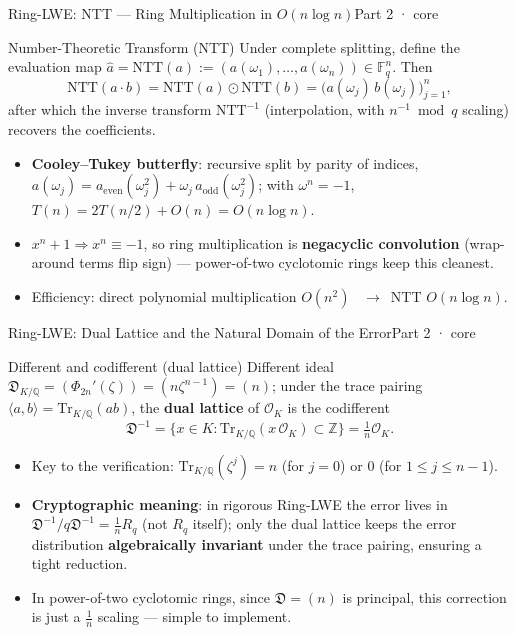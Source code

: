 \documentclass[aspectratio=169, 11pt]{beamer}
\newcommand{\Z}{\mathbb{Z}}
\newcommand{\Q}{\mathbb{Q}}
\newcommand{\F}{\mathbb{F}}
\newcommand{\OK}{\mathcal{O}_K}
\newcommand{\Tr}{\mathrm{Tr}}
\begin{document}
\begin{frame}{Ring-LWE: NTT --- Ring Multiplication in $O(n\log n)$}{Part 2 · core}
  \begin{block}{Number-Theoretic Transform (NTT)}
    Under complete splitting, define the evaluation map
    $\widehat{a}=\mathrm{NTT}(a):=(a(\omega_1),\dots,a(\omega_n))\in\F_q^n$. Then
    \[
      \mathrm{NTT}(a\cdot b)=\mathrm{NTT}(a)\odot\mathrm{NTT}(b)
      =\bigl(a(\omega_j)\,b(\omega_j)\bigr)_{j=1}^n,
    \]
    after which the inverse transform $\mathrm{NTT}^{-1}$ (interpolation, with $n^{-1}\bmod q$ scaling) recovers the coefficients.
  \end{block}
  \begin{itemize}\small
    \item \textbf{Cooley--Tukey butterfly}: recursive split by parity of indices,
      $a(\omega_j)=a_{\text{even}}(\omega_j^2)+\omega_j\,a_{\text{odd}}(\omega_j^2)$;
      with $\omega^n=-1$, $T(n)=2T(n/2)+O(n)=O(n\log n)$.
    \item $x^n+1\Rightarrow x^n\equiv-1$, so ring multiplication is \textbf{negacyclic convolution}
      (wrap-around terms flip sign) --- power-of-two cyclotomic rings keep this cleanest.
    \item Efficiency: direct polynomial multiplication $O(n^2)$ \ $\to$\ NTT $O(n\log n)$.
  \end{itemize}
\end{frame}

\begin{frame}{Ring-LWE: Dual Lattice and the Natural Domain of the Error}{Part 2 · core}
  \begin{block}{Different and codifferent (dual lattice)}
    Different ideal $\mathfrak{D}_{K/\Q}=(\Phi_{2n}'(\zeta))=(n\zeta^{n-1})=(n)$;
    under the trace pairing $\langle a,b\rangle=\Tr_{K/\Q}(ab)$, the \textbf{dual lattice} of $\OK$ is the codifferent
    \[
      \mathfrak{D}^{-1}=\{x\in K:\Tr_{K/\Q}(x\,\OK)\subset\Z\}=\tfrac1n\OK.
    \]
  \end{block}
  \begin{itemize}\small
    \item Key to the verification: $\Tr_{K/\Q}(\zeta^j)=n$ (for $j=0$) or $0$ (for $1\le j\le n-1$).
    \item \textbf{Cryptographic meaning}: in rigorous Ring-LWE the error lives in
      $\mathfrak{D}^{-1}/q\mathfrak{D}^{-1}=\tfrac1n R_q$ (not $R_q$ itself);
      only the dual lattice keeps the error distribution \textbf{algebraically invariant} under the trace pairing, ensuring a tight reduction.
    \item In power-of-two cyclotomic rings, since $\mathfrak{D}=(n)$ is principal, this correction is just a $\tfrac1n$ scaling --- simple to implement.
  \end{itemize}
\end{frame}
\end{document}
